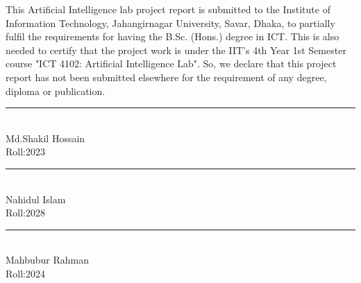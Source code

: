 This Artificial Intelligence lab project report is submitted to the Institute of Information Technology, Jahangirnagar University, Savar, Dhaka, to partially fulfil the requirements for having the B.Sc. (Hons.) degree in ICT. This is also needed to certify that the project work is under the IIT's 4th Year 1st Semester course "ICT 4102: Artificial Intelligence Lab". So, we declare that this project report has not been submitted elsewhere for the requirement of any degree, diploma or publication.

\vspace{1in}


\noindent   \rule{3.5cm}{1pt} \\
   Md.Shakil Hossain\\
   Roll:2023 \\

\noindent   \rule{3.5cm}{1pt} \\
   Nahidul Islam\\
   Roll:2028 \\

\noindent   \rule{3.5cm}{1pt} \\
   Mahbubur Rahman\\
   Roll:2024\\

